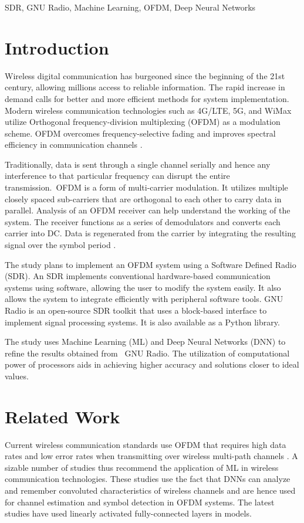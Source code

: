 \documentclass[conference]{IEEEtran}
\begin{document}
\begin{IEEEkeywords}
SDR, GNU Radio, Machine Learning, OFDM, Deep Neural Networks
\end{IEEEkeywords}

\section{Introduction}

Wireless digital communication has burgeoned since the beginning of the 21st century, allowing millions access to reliable information. The rapid increase in demand calls for better and more efficient methods for system implementation. Modern wireless communication technologies such as 4G/LTE, 5G, and WiMax \cite{b1} utilize Orthogonal frequency-division multiplexing (OFDM) as a modulation scheme. OFDM overcomes frequency-selective fading and improves spectral efficiency in communication channels \cite{b2}.


Traditionally, data is sent through a single channel serially and hence any interference to that particular frequency can disrupt the entire transmission. OFDM is a form of multi-carrier modulation. It utilizes multiple closely spaced sub-carriers that are orthogonal to each other to carry data in parallel. Analysis of an OFDM receiver can help understand the working of the system. The receiver functions as a series of demodulators and converts each carrier into DC. Data is regenerated from the carrier by integrating the resulting signal over the symbol period \cite{b3}.

The study plans to implement an OFDM system using a Software Defined Radio (SDR). An SDR implements conventional hardware-based communication systems using software, allowing the user to modify the system easily. It also allows the system to integrate efficiently with peripheral software tools. GNU Radio is an open-source SDR toolkit that uses a block-based interface to implement signal processing systems. It is also available as a Python library.

The study uses Machine Learning (ML) and Deep Neural Networks (DNN) to refine the results obtained from  GNU Radio. The utilization of computational power of processors aids in achieving higher accuracy and solutions closer to ideal values. 

\section{Related Work}
Current wireless communication standards use OFDM that requires high data rates and low error rates when transmitting over wireless multi-path channels \cite{b1}. A sizable number of studies thus recommend the application of ML in wireless communication technologies. These studies use the fact that DNNs can analyze and remember convoluted characteristics of wireless channels and are hence used for channel estimation \cite{b2} and symbol detection \cite{b4} \cite{b5} in OFDM systems. The latest studies have used linearly activated fully-connected layers \cite{b4} in models.
\end{document}
